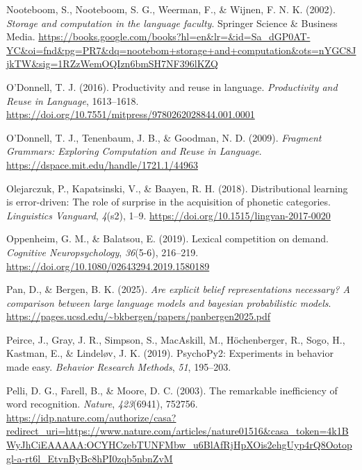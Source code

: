 \documentclass[
  12pt,
  letterpaper,
]{scrreport}
\newlength{\cslhangindent}
\newenvironment{CSLReferences}[2] %
 {\begin{list}{}{%
  \setlength{\itemindent}{0pt}
  \setlength{\leftmargin}{0pt}
  \setlength{\parsep}{0pt}
  \ifodd #1
   \setlength{\leftmargin}{\cslhangindent}
   \setlength{\itemindent}{-1\cslhangindent}
  \fi
  \setlength{\itemsep}{#2\baselineskip}}}
 {\end{list}}
\begin{document}
\begin{CSLReferences}{1}{0}
Nooteboom, S., Nooteboom, S. G., Weerman, F., \& Wijnen, F. N. K.
(2002). \emph{Storage and computation in the language faculty}. Springer
Science \& Business Media.
\url{https://books.google.com/books?hl=en&lr=&id=Sa_dGP0AT-YC&oi=fnd&pg=PR7&dq=nootebom+storage+and+computation&ots=nYGC8JjkTW&sig=1RZzWemOQIzn6bmSH7NF396lKZQ}

O'Donnell, T. J. (2016). Productivity and reuse in language.
\emph{Productivity and Reuse in Language}, 1613--1618.
\url{https://doi.org/10.7551/mitpress/9780262028844.001.0001}

O'Donnell, T. J., Tenenbaum, J. B., \& Goodman, N. D. (2009).
\emph{Fragment Grammars: Exploring Computation and Reuse in Language}.
\url{https://dspace.mit.edu/handle/1721.1/44963}

Olejarczuk, P., Kapatsinski, V., \& Baayen, R. H. (2018). Distributional
learning is error-driven: The role of surprise in the acquisition of
phonetic categories. \emph{Linguistics Vanguard}, \emph{4}(s2), 1--9.
\url{https://doi.org/10.1515/lingvan-2017-0020}

Oppenheim, G. M., \& Balatsou, E. (2019). Lexical competition on demand.
\emph{Cognitive Neuropsychology}, \emph{36}(5-6), 216--219.
\url{https://doi.org/10.1080/02643294.2019.1580189}

Pan, D., \& Bergen, B. K. (2025). \emph{Are explicit belief
representations necessary? A comparison between large language models
and bayesian probabilistic models}.
\url{https://pages.ucsd.edu/~bkbergen/papers/panbergen2025.pdf}

Peirce, J., Gray, J. R., Simpson, S., MacAskill, M., Höchenberger, R.,
Sogo, H., Kastman, E., \& Lindeløv, J. K. (2019). PsychoPy2: Experiments
in behavior made easy. \emph{Behavior Research Methods}, \emph{51},
195--203.

Pelli, D. G., Farell, B., \& Moore, D. C. (2003). The remarkable
inefficiency of word recognition. \emph{Nature}, \emph{423}(6941),
752756.
\url{https://idp.nature.com/authorize/casa?redirect_uri=https://www.nature.com/articles/nature01516&casa_token=4k1BWyJhCiEAAAAA:OCYHCzebTUNFMbw_u6BlAfRjHpXOis2ehgUyp4rQ8Ootopgl-a-rt6l_EtvnByBc8hPI0zqb5nbnZvM}


\end{CSLReferences}
\end{document}
